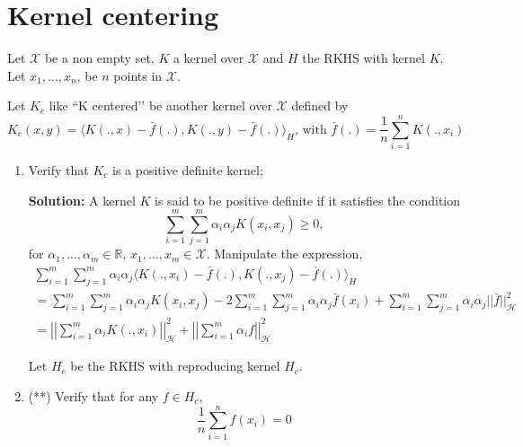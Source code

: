 \documentclass{article}[12pt]
\begin{document}
\section{Kernel centering}
Let $\mathcal{X}$ be a non empty set, $K$ a kernel over $\mathcal{X}$ and $H$ the RKHS with kernel $K$. Let $x_1,\ldots,x_n$, be $n$ points in $\mathcal{X}$. 

Let $K_c$ like ``K centered\rq\rq{} be another kernel over $\mathcal{X}$ defined by 
\begin{equation}
K_c(x,y)=\langle K(.,x)- \bar{f}(.), K(.,y)-\bar{f}(.)\rangle_H \mbox{, with } \bar{f}(.)=\frac{1}{n}\sum_{i=1}^n K(.,x_i)
\end{equation}
\begin{enumerate}
\item Verify that $K_c$ is a positive definite kernel;

	\textbf{Solution:} A kernel $K$ is said to be positive definite if it satisfies the condition \begin{equation}
		\sum^{m}_{i=1} \sum^{m}_{j=1} \alpha_i \alpha_j K(x_i, x_j) \ge 0,  		
\end{equation}
for $\alpha_1,...,\alpha_m \in \mathbb R$, $x_1,...,x_m \in \mathcal X$. Manipulate the expression, 
\begin{equation}
	\begin{aligned}
		\sum^{m}_{i=1} \sum^{m}_{j=1} \alpha_i \alpha_j  \langle K(.,x_i)- \bar{f}(.), K(.,x_j)-\bar{f}(.)\rangle_H \\ 
		= \sum^{m}_{i=1} \sum^{m}_{j=1} \alpha_i \alpha_j K(x_i, x_j) - 2 \sum^{m}_{i=1} \sum^{m}_{j=1} \alpha_i \alpha_j \bar f(x_i)  + \sum^{m}_{i=1} \sum^{m}_{j=1} \alpha_i \alpha_j || \bar f ||_{\mathcal H}^2 \\
		= \left| \left| \sum^{m}_{i=1} \alpha_i K(., x_i)  \right| \right|^2_{\mathcal H} + \left| \left| \sum^{m}_{i=1} \alpha_i f  \right| \right|^2_{\mathcal H}
	\end{aligned}
\end{equation}

	
\noindent
Let $H_c$ be the RKHS with reproducing kernel $H_c$. 
\item (**) Verify that for any $f \in H_c$, 
\begin{equation}
\frac{1}{n} \sum_{i=1}^n f(x_i)=0
\end{equation}


\end{enumerate}
\end{document}
